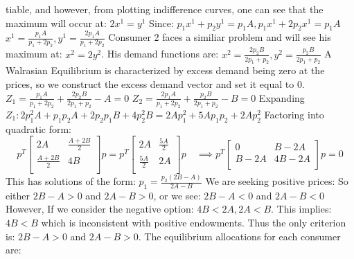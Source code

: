 \documentclass[10pt, letterpaper]{paper}
\begin{document}
tiable, and however, from plotting indifference curves, one can see that the maximum will occur at: $2x^1 = y^1$
\newline
Since: $p_1 x^1 + p_2 y^1 = p_1 A, p_1 x^1 + 2 p_2 x^1 = p_1 A$
\newline
$x^1 = \frac{ p_1 A }{ p_1 + 2p_2 }, y^1 = \frac{ 2p_1 A}{p_1 + 2p_2}$ 
\newline
Consumer 2 faces a similiar problem and will see his maximum at: $x^2 = 2 y^2$.
\newline
His demand functions are: $ x^2 = \frac{ 2p_2 B }{ 2p_1 + p_2}, y^2 = \frac{ p_2 B }{ 2p_1 + p_2 }$
\newline \newline
A Walrasian Equilibrium is characterized by excess demand being zero at the prices, so we construct the excess demand vector and set it equal to 0.
\newline
$Z_1 = \frac{ p_1 A }{ p_1 + 2p_2} + \frac{ 2p_2 B}{ 2p_1 + p_2 } - A = 0$
\newline
$Z_2 = \frac{ 2 p_1 A }{ p_1 + 2p_2 } + \frac{ p_2 B }{ 2p_1 + p_2 } - B = 0$
\newline
Expanding $Z_1: 2p_1^2 A + p_1 p_2 A + 2p_2 p_1 B + 4p_2^2 B = 2Ap_1^2 + 5Ap_1 p_2 + 2Ap_2^2$
\newline
Factoring into quadratic form:  
\[
	p^T
	\left[ {\begin{array}{cc}
	2A & \frac{ A + 2B }{2} \\
	\frac{ A + 2B}{2} & 4B \\
	\end{array} } \right]
	p = p^T
	\left[ {\begin{array}{cc}
	2A & \frac{5A}{2} \\
	\frac{5A}{2} & 2A \\
	\end{array} } \right] p \quad \implies
	p^T
	\left[ {\begin{array}{cc}
	0 & B - 2A \\
	B - 2A & 4B - 2A \\
	\end{array} } \right]
	p = 0
\]
\newline
This has solutions of the form: $p_1 = \frac{ p_2 (2B - A) }{2A - B}$
\newline
We are seeking positive prices: So either $2B - A > 0$ and $2A - B > 0$, or we see: $2B - A < 0$ and $2A - B < 0$
\newline
However, If we consider the negative option: $4B < 2A, 2A < B$. This implies: $4B < B$ which is inconsistent with positive endowments. Thus the only criterion is:
$2B - A > 0$ and $2A - B > 0$.
\newline
The equilibrium allocations for each consumer are:
\end{document}
